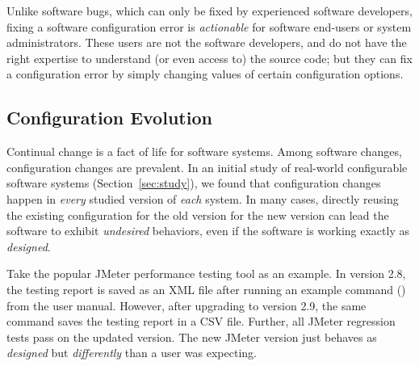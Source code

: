 Unlike software bugs,
which can only be fixed by experienced software developers, fixing a software
configuration error is \textit{actionable} for software end-users
or system administrators. These users are not the software developers,
and do not have the right expertise to understand (or even access to)
the source code;  but they can fix a configuration error by simply changing
values of certain configuration options.


\subsection{Configuration Evolution}
\label{sec:evolerror}

Continual change is a fact of life for software systems.
Among software changes, configuration changes are prevalent.
In an initial study of \studysubjnum real-world configurable software
systems (Section~\ref{sec:study}),
we found that configuration changes happen in \textit{every} studied
version of \textit{each} system. In many 
cases, directly reusing the existing configuration
for the old version for the new
version can lead the software to exhibit \textit{undesired} behaviors,
even if the software is working exactly as \textit{designed}.






Take the popular JMeter performance testing tool as an example.
In version 2.8, the testing report is saved as an XML
file after running an example command ()
from the user manual.
However, after upgrading to version 2.9, 
the same command saves the testing report
in a CSV file. Further, all JMeter regression tests pass 
on the updated version.  The new JMeter version
just behaves as \textit{designed} but \textit{differently}
than a user was expecting.


